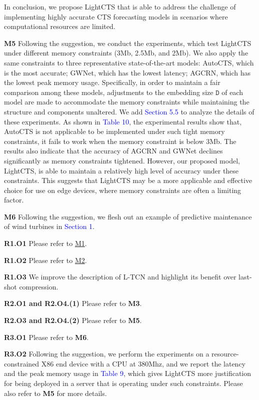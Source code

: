 \documentclass[sigconf,screen,anonymous=false]{acmart}
\newcommand{\where}[1]{{\textcolor{blue}{#1}}}
\begin{document}
In conclusion, we propose LightCTS that is able to address the challenge of implementing highly accurate CTS forecasting models in scenarios where computational resources are limited. 




\noindent
\textbf{M5} Following the suggestion, we conduct the experiments, which test LightCTS under different memory constraints (3Mb, 2.5Mb, and 2Mb). We also apply the same constraints to three representative state-of-the-art models: AutoCTS, which is the most accurate; GWNet, which has the lowest latency; AGCRN, which has the lowest peak memory usage. Specifically, in order to maintain a fair comparison among these models, adjustments to the embedding size $\mathtt{D}$ of each model are made to accommodate the memory constraints while maintaining the structure and components unaltered. We add \where{Section 5.5} to analyze the details of these experiments. As shown in \where{Table 10}, the experimental results show that, AutoCTS is not applicable to be implemented under such tight memory constraints, it fails to work when the memory constraint is below 3Mb. The results also indicate that the accuracy of AGCRN and GWNet declines significantly as memory constraints tightened. However, our proposed model, LightCTS, is able to maintain a relatively high level of accuracy under these constraints. This suggests that LightCTS may be a more applicable and effective choice for use on edge devices, where memory constraints are often a limiting factor.


\noindent
\textbf{M6} Following the suggestion, we flesh out an example of predictive maintenance of wind turbines in \where{Section 1}.






\noindent
\textbf{R1.O1}\label{R1O1}
Please refer to \hyperref[M1]{M1}.

\noindent
\textbf{R1.O2} Please refer to \hyperref[M2]{M2}.

\noindent
\textbf{R1.O3}
We improve the description of L-TCN and highlight its benefit over last-shot compression.

\noindent
\textbf{R2.O1 and R2.O4.(1)} Please refer to \textbf{M3}.

\noindent
\textbf{R2.O3 and R2.O4.(2)} Please refer to \textbf{M5}.

\noindent
\textbf{R3.O1} Please refer to \textbf{M6}.

\noindent
\textbf{R3.O2} Following the suggestion, we perform the experiments on a resource-constrained X86 end device with a CPU at 380Mhz, and we report the latency and the peak memory usage in \where{Table 9}, which gives LightCTS more justification for being deployed in a server that is operating under such constraints. Please also refer to \textbf{M5} for more details.

\clearpage
\balance
\end{document}
